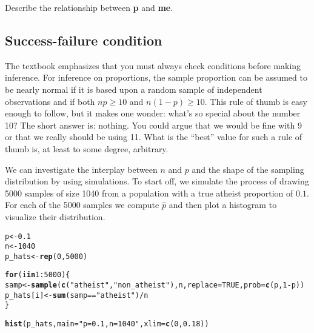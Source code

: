 \documentclass{article}\usepackage[]{graphicx}\usepackage[]{color}
\makeatletter
\newcommand{\hlnum}[1]{\textcolor[rgb]{0.686,0.059,0.569}{#1}}%
\newcommand{\hlstr}[1]{\textcolor[rgb]{0.192,0.494,0.8}{#1}}%
\newcommand{\hlopt}[1]{\textcolor[rgb]{0,0,0}{#1}}%
\newcommand{\hlstd}[1]{\textcolor[rgb]{0.345,0.345,0.345}{#1}}%
\newcommand{\hlkwa}[1]{\textcolor[rgb]{0.161,0.373,0.58}{\textbf{#1}}}%
\newcommand{\hlkwb}[1]{\textcolor[rgb]{0.69,0.353,0.396}{#1}}%
\newcommand{\hlkwc}[1]{\textcolor[rgb]{0.333,0.667,0.333}{#1}}%
\newcommand{\hlkwd}[1]{\textcolor[rgb]{0.737,0.353,0.396}{\textbf{#1}}}%
\newenvironment{kframe}{%
 \def\at@end@of@kframe{}%
 \ifinner\ifhmode%
  \def\at@end@of@kframe{\end{minipage}}%
  \begin{minipage}{\columnwidth}%
 \fi\fi%
 \def\FrameCommand##1{\hskip\@totalleftmargin \hskip-\fboxsep
 \colorbox{shadecolor}{##1}\hskip-\fboxsep
     \hskip-\linewidth \hskip-\@totalleftmargin \hskip\columnwidth}%
 \MakeFramed {\advance\hsize-\width
   \@totalleftmargin\z@ \linewidth\hsize
   \@setminipage}}%
 {\par\unskip\endMakeFramed%
 \at@end@of@kframe}
\newenvironment{knitrout}{}{} %
\makeatother
\begin{document}
\begin{exercise}
Describe the relationship between \hlkwd{p} and \hlkwd{me}.
\end{exercise}

\subsection*{Success-failure condition}
The textbook emphasizes that you must always check conditions before making inference. For inference on proportions, the sample proportion can be assumed to be nearly normal if it is based upon a random sample of independent observations and if both $np \geq 10$ and $n(1 - p) \geq 10$. This rule of thumb is easy enough to follow, but it makes one wonder: what's so special about the number 10? The short answer is: nothing. You could argue that we would be fine with 9 or that we really should be using 11. What is the ``best'' value for such a rule of thumb is, at least to some degree, arbitrary.


We can investigate the interplay between $n$ and $p$ and the shape of the sampling distribution by using simulations. To start off, we simulate the process of drawing 5000 samples of size 1040 from a population with a true atheist proportion of $0.1$. For each of the 5000 samples we compute $\hat{p}$ and then plot a histogram to visualize their distribution.

\begin{knitrout}
\color{fgcolor}\begin{kframe}
\begin{alltt}
\hlstd{p} \hlkwb{<-} \hlnum{0.1}
\hlstd{n} \hlkwb{<-} \hlnum{1040}
\hlstd{p_hats} \hlkwb{<-} \hlkwd{rep}\hlstd{(}\hlnum{0}\hlstd{,} \hlnum{5000}\hlstd{)}

\hlkwa{for}\hlstd{(i} \hlkwa{in} \hlnum{1}\hlopt{:}\hlnum{5000}\hlstd{)\{}
  \hlstd{samp} \hlkwb{<-} \hlkwd{sample}\hlstd{(}\hlkwd{c}\hlstd{(}\hlstr{"atheist"}\hlstd{,} \hlstr{"non_atheist"}\hlstd{), n,} \hlkwc{replace} \hlstd{=} \hlnum{TRUE}\hlstd{,} \hlkwc{prob} \hlstd{=} \hlkwd{c}\hlstd{(p,} \hlnum{1}\hlopt{-}\hlstd{p))}
  \hlstd{p_hats[i]} \hlkwb{<-} \hlkwd{sum}\hlstd{(samp} \hlopt{==} \hlstr{"atheist"}\hlstd{)}\hlopt{/}\hlstd{n}
\hlstd{\}}

\hlkwd{hist}\hlstd{(p_hats,} \hlkwc{main} \hlstd{=} \hlstr{"p = 0.1, n = 1040"}\hlstd{,} \hlkwc{xlim} \hlstd{=} \hlkwd{c}\hlstd{(}\hlnum{0}\hlstd{,} \hlnum{0.18}\hlstd{))}
\end{alltt}
\end{kframe}
\end{knitrout}
\end{document}
